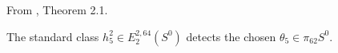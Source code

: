 \begin{theorem}
\label{frontier:Literature:71f4461cf400}
From \cite{BJMtheta5}, Theorem 2.1.\par

The standard class $h_5^2\in E_2^{2,64}(S^0)$ detects the chosen $\theta_5\in\pi_{62}S^0$.
\end{theorem}

